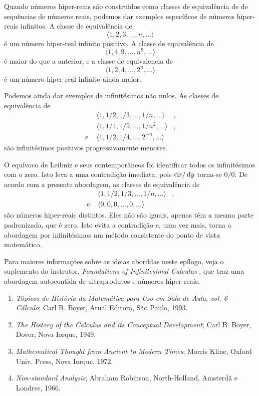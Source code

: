 Quando números hiper-reais são construidos como classes de equivalência de
de sequências de números reais, podemos dar exemplos específicos de números
hiper-reais infinitos. A classe de equivalência de
$$
  \langle 1, 2, 3, \ldots, n, \ldots \rangle
$$
é um número hiper-real infinito positivo. A classe de equivalência de
$$
  \langle 1, 4, 9, \ldots, n^9, \ldots \rangle
$$
é maior do que a anterior, e a classe de equivalencia de
$$
  \langle 1, 2, 4, \ldots, 2^n, \ldots \rangle
$$
é um número hiper-real infinito ainda maior.

Podemos ainda dar exemplos de infinitésimos não nulos. As classes de
equivalência de
$$
  \begin{array}{rcl}
            & \langle 1, 1/2, 1/3, \ldots, 1/n, \ldots \rangle & , \\
            & \langle 1, 1/4, 1/9, \ldots, 1/n^2, \ldots \rangle & , \\
  \text{e } & \langle 1, 1/2, 1/4, \ldots, 2^{-n}, \ldots \rangle &
  \end{array}
$$
são infinitésimos positivos progressivamente menores.

O equívoco de Leibniz e seus contemporâneos foi identificar todos os
infinitésimos com o zero. Isto leva a uma contradição imediata, pois
$\dif{x}/\dif{y}$ torna-se $0/0$. De acordo com a presente abordagem,
as classes de equivalência de
$$
  \begin{array}{rcl}
            & \langle 1, 1/2, 1/3, \ldots, 1/n, \ldots \rangle & , \\
  \text{e } & \langle 0, 0,  0, \ldots, 0, \ldots \rangle &
  \end{array}
$$
são números hiper-reais distintos. Eles não são iguais, apenas têm a
mesma parte padronizada, que é zero. Isto evita a contradição e, uma
vez mais, torna a abordagem por infinitésimos um método consistente
do ponto de vista matemático.

Para maiores informações sobre as ideias aborddas neste epílogo, veja
o suplemento do instrutor, \emph{Foundations of Infinitesimal Calculus}%
, que traz uma
abordagem autocontida de ultraprodutos e números hiper-reais.


\begin{enumerate}[]
\item \emph{Tópicos de História da Matemática para Uso em Sala de Aula, vol. 6 -- Cálculo}; Carl B. Boyer, Atual Editora, São Paulo, 1993.
\item \emph{The History of the Calculus and its Conceptual Development}; Carl B. Boyer, Dover, Nova Iorque, 1949.
\item \emph{Mathematical Thought from Ancient to Modern Times}; Morris Kline, Oxford Univ. Press, Nova Iorque, 1972.
\item \emph{Non-standard Analysis}; Abraham Robinson, North-Holland, Amsterdã e Londres, 1966.
\end{enumerate}


